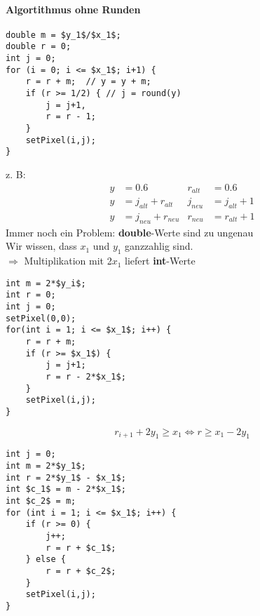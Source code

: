 	\paragraph*{Algortithmus ohne Runden}
	\begin{lstlisting}[mathescape=true]
double m = $y_1$/$x_1$;
double r = 0;
int j = 0;
for (i = 0; i <= $x_1$; i+1) {
	r = r + m;	// y = y + m;
	if (r >= 1/2) {	// j = round(y)
		j = j+1,
		r = r - 1;
	}
	setPixel(i,j);
}
	\end{lstlisting}
z. B:
\begin{align*}
 y &= 0.6 & r_{alt} &= 0.6 \\
 y &= j_{alt} + r_{alt} & j_{neu} &= j_{alt} + 1\\
 y &= j_{neu} + r_{neu} & r_{neu} &= r_{alt} + 1 
\end{align*}
Immer noch ein Problem: \textbf{double}-Werte sind zu ungenau\\
Wir wissen, dass $x_1$ und $y_1$ ganzzahlig sind.\\
$\Rightarrow$ Multiplikation mit 2$x_1$ liefert \textbf{int}-Werte
\begin{lstlisting}[mathescape=true]
int m = 2*$y_i$;
int r = 0;
int j = 0;
setPixel(0,0);
for(int i = 1; i <= $x_1$; i++) {
	r = r + m;
	if (r >= $x_1$) {
		j = j+1;
		r = r - 2*$x_1$;
	}
	setPixel(i,j);
}
\end{lstlisting}
\[r_{i+1} + 2y_1 \ge x_1 \Leftrightarrow r \ge x_1 - 2 y_1\]
\begin{lstlisting}[mathescape=true]
int j = 0;
int m = 2*$y_1$;
int r = 2*$y_1$ - $x_1$;
int $c_1$ = m - 2*$x_1$;
int $c_2$ = m;
for (int i = 1; i <= $x_1$; i++) {
	if (r >= 0) {
		j++;
		r = r + $c_1$;
	} else {
		r = r + $c_2$;
	}
	setPixel(i,j);
}
\end{lstlisting}

